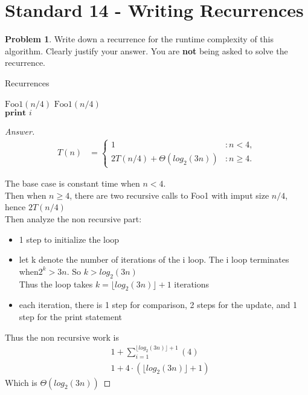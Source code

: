 \documentclass[11pt]{article}
\theoremstyle{definition}
\theoremstyle{definition}
\newtheorem{required}{Problem}
\theoremstyle{definition}
\begin{document}
\newpage
\section{Standard 14 - Writing Recurrences}
\begin{required}
Write down a recurrence for the runtime complexity of this algorithm. Clearly justify your answer. You are \textbf{not} being asked to solve the recurrence.

\begin{algorithm}
\caption{Recurrences}\label{alg:NestedIndependent}
\begin{algorithmic}[1]
\EndIf


\State $\text{Foo1}(n/4)$
\State $\text{Foo1}(n/4)$ \\

	\State $\textbf{print } i$
\EndFor
\EndProcedure
\end{algorithmic}
\end{algorithm}
\end{required}

\begin{proof}[Answer]

\begin{align*}
T(n) &= \begin{cases}
1 & : n < 4, \\
2T(n/4) +  \Theta(log_2(3n)) & : n \geq 4.
\end{cases}
\end{align*}

The base case is constant time when $n<4$.\\
Then when $n \geq 4$, there are two recursive calls to Foo1 with imput size $n/4$, hence $2T(n/4)$ \\
Then analyze the non recursive part:\\
\begin{itemize}
\item 1 step to initialize the loop
\item let k denote the number of iterations of the i loop. The i loop terminates when$ 2^k > 3n$. So $k > log_2(3n)$ \\
Thus the loop takes $k=\lfloor log_2(3n) \rfloor +1$ iterations
\item each iteration, there is 1 step for comparison, 2 steps for the update, and 1 step for the print statement 
\end{itemize}
Thus the non recursive work is \\
\begin{align*}
 & 1+\sum_{i=1}^{\lfloor log_2(3n)\rfloor+1}(4)\\
& 1+4\cdot({\lfloor log_2(3n)\rfloor+1})
\end{align*}
Which is $\Theta(log_2(3n))$

\end{proof}
\end{document}
